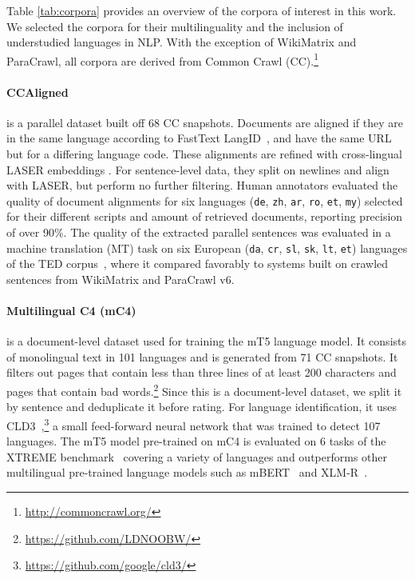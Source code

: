 Table \ref{tab:corpora} provides an overview of the corpora of interest in this work. We selected the corpora for their multilinguality and the inclusion of understudied languages in NLP. With the exception of WikiMatrix and ParaCrawl, all corpora are derived from Common Crawl (CC).\footnote{\url{http://commoncrawl.org/}}

\paragraph{CCAligned~\citep{el-kishky-etal-2020-ccaligned}}is a parallel dataset built off 68 CC snapshots. Documents are aligned if they are in the same language according to FastText LangID~\citep{joulin-etal-2016-fasttext,joulin-etal-2017-bag}, and have the same URL but for a differing language code. These alignments are refined with cross-lingual LASER embeddings \citep{artetxe-schwenk-2019-massively}. For sentence-level data, they split on newlines and align with LASER, but perform no further filtering.
Human annotators evaluated the quality of document alignments for six languages (\texttt{de}, \texttt{zh}, \texttt{ar}, \texttt{ro}, \texttt{et}, \texttt{my}) selected for their different scripts and amount of retrieved documents, reporting precision of over 90\%. The quality of the extracted parallel sentences was evaluated in a machine translation (MT) task on six European (\texttt{da}, \texttt{cr}, \texttt{sl}, \texttt{sk}, \texttt{lt}, \texttt{et}) languages of the TED corpus~\citep{qi-etal-2018-pre}, where it compared favorably to systems built on crawled sentences from WikiMatrix and ParaCrawl v6.

\paragraph{Multilingual C4 (mC4)~\citep{xue-etal-2021-mt5}} is a document-level dataset used for training the mT5 language model. It consists of monolingual text in 101 languages and is generated from 71 CC snapshots. It filters out pages that contain less than three lines of at least 200 characters and pages that contain bad words.\footnote{\url{https://github.com/LDNOOBW/}} Since this is a document-level dataset, we split it by sentence and deduplicate it before rating. For language identification, it uses CLD3~\citep{botha-etal-2017-natural},\footnote{\url{https://github.com/google/cld3/}} a small feed-forward neural network that was trained to detect 107 languages. The mT5 model pre-trained on mC4 is evaluated on 6 tasks of the XTREME benchmark~\citep{hu-etal-2020-xtreme} covering a variety of languages and outperforms other multilingual pre-trained language models such as mBERT~\citep{devlin-etal-2019-bert} and XLM\nobreakdash-R~\citep{conneau-etal-2020-unsupervised}.

